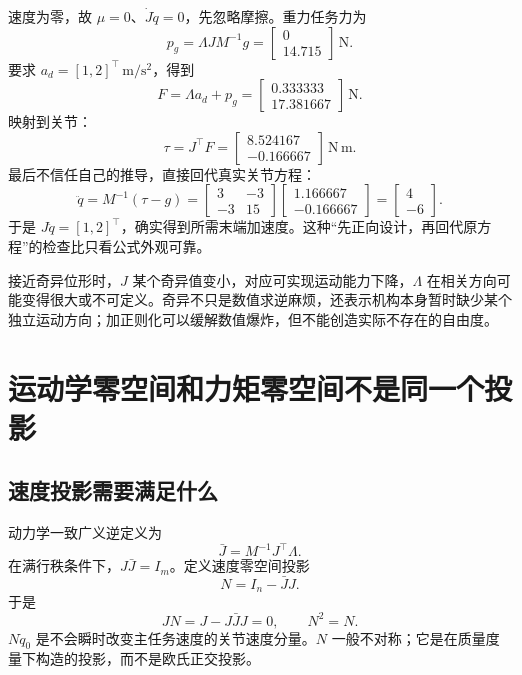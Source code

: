 \begin{examplebox}[算例 16A 从期望末端加速度算到关节力矩再验算]
速度为零，故 $\mu=0$、$\dot J\dot q=0$，先忽略摩擦。重力任务力为
\[
p_g=\Lambda JM^{-1}g=
\begin{bmatrix}0\\14.715\end{bmatrix}\,\mathrm{N}.
\]
要求 $a_d=[1,2]^\top\,\mathrm{m/s^2}$，得到
\[
F=\Lambda a_d+p_g=
\begin{bmatrix}0.333333\\17.381667\end{bmatrix}\,\mathrm{N}.
\]
映射到关节：
\[
\tau=J^\top F=
\begin{bmatrix}8.524167\\-0.166667\end{bmatrix}\,\mathrm{N\,m}.
\]
最后不信任自己的推导，直接回代真实关节方程：
\[
\ddot q=M^{-1}(\tau-g)
=\begin{bmatrix}3&-3\\-3&15\end{bmatrix}
\begin{bmatrix}1.166667\\-0.166667\end{bmatrix}
=\begin{bmatrix}4\\-6\end{bmatrix}.
\]
于是 $J\ddot q=[1,2]^\top$，确实得到所需末端加速度。这种“先正向设计，再回代原方程”的检查比只看公式外观可靠。
\end{examplebox}

接近奇异位形时，$J$ 某个奇异值变小，对应可实现运动能力下降，$\Lambda$ 在相关方向可能变得很大或不可定义。奇异不只是数值求逆麻烦，还表示机构本身暂时缺少某个独立运动方向；加正则化可以缓解数值爆炸，但不能创造实际不存在的自由度。

\section{运动学零空间和力矩零空间不是同一个投影}

\subsection{速度投影需要满足什么}

动力学一致广义逆定义为
\begin{equation}
\bar J=M^{-1}J^\top\Lambda.
\end{equation}
在满行秩条件下，$J\bar J=I_m$。定义速度零空间投影
\begin{equation}
N=I_n-\bar J J.
\end{equation}
于是
\[
JN=J-J\bar JJ=0,\qquad N^2=N.
\]
$N\dot q_0$ 是不会瞬时改变主任务速度的关节速度分量。$N$ 一般不对称；它是在质量度量下构造的投影，而不是欧氏正交投影。


